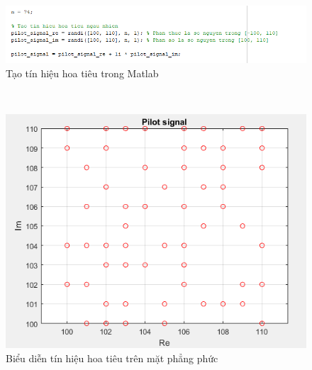 \documentclass{article}
\begin{document}
\begin{figure}[h!]
    \centering
    \includegraphics[width=14cm]{photo/5.1.1.png}
    \caption{Tạo tín hiệu hoa tiêu trong Matlab}
    \label{Hình 15}
\end{figure}\\
\begin{figure}[h!]
    \centering
    \includegraphics[width=14cm]{photo/5.1.2.png}
    \caption{Biểu diễn tín hiệu hoa tiêu trên mặt phẳng phức}
    \label{Hình 16}
\end{figure}
\end{document}
